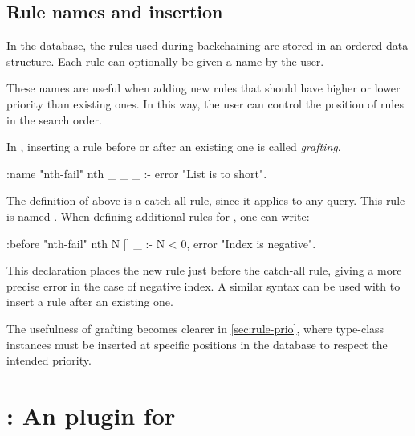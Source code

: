 \subsection{Rule names and insertion}
\label{sec:elpi-rule-names}

In the \elpi database, the rules used during backchaining are stored in
an ordered data structure. Each rule
can optionally be given a name by the user.

These names are useful when adding new rules that should have higher or
lower priority than existing ones. In this way, the user can control the
position of rules in the search order.

In \elpi, inserting a rule before or after an existing one is called
\emph{grafting}.

\vspace{1em}

\noindent
\begin{minipage}{\textwidth}
\begin{elpicode}
  :name "nth-fail"
  nth _ _ _ :- error "List is to short".
\end{elpicode}
\end{minipage}

\vspace{1em}

The definition of  above is a catch-all rule, since it applies to
any query. This rule is named .
When defining additional rules for , one can write:

\begin{elpicode}
  :before "nth-fail"
  nth N [] _ :- N < 0, error "Index is negative".
\end{elpicode}

This declaration places the new rule just before the catch-all rule,
giving a more precise error in the case of negative index. A
similar syntax can be used with  to insert a rule after an
existing one.

The usefulness of grafting becomes clearer in
\cref{sec:rule-prio}, where type-class instances must be inserted at
specific positions in the database to respect the intended priority.


\section{\rocqelpi: An \elpi plugin for \rocq}
\label{sec:coq-elpi}

